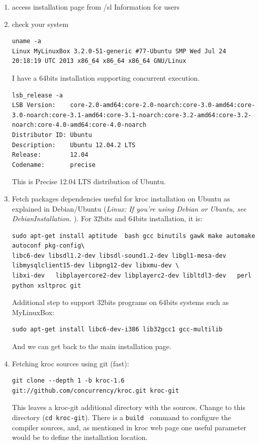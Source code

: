 \documentclass[times]{book}
\begin{document}
\begin{enumerate}
\item access installation page from {/sl Information for users}
\item check your system\\
\begin{lstlisting}
uname -a
Linux MyLinuxBox 3.2.0-51-generic #77-Ubuntu SMP Wed Jul 24 20:18:19 UTC 2013 x86_64 x86_64 x86_64 GNU/Linux
\end{lstlisting}

I have a 64bits installation supporting concurrent execution.
\begin{lstlisting} 
lsb_release -a
LSB Version:    core-2.0-amd64:core-2.0-noarch:core-3.0-amd64:core-3.0-noarch:core-3.1-amd64:core-3.1-noarch:core-3.2-amd64:core-3.2-noarch:core-4.0-amd64:core-4.0-noarch
Distributor ID: Ubuntu
Description:    Ubuntu 12.04.2 LTS
Release:        12.04
Codename:       precise
\end{lstlisting}

This is Precise 12.04 LTS distribution of Ubuntu.
\item Fetch packages dependencies useful for kroc installation on Ubuntu as explained in Debian/Ubuntu
({\sl Linux:   If you're using Debian or Ubuntu, see DebianInstallation. }). For 32bits and 64bits installation, it is:
\begin{lstlisting} 
sudo apt-get install aptitude  bash gcc binutils gawk make automake autoconf pkg-config\
libc6-dev libsdl1.2-dev libsdl-sound1.2-dev libgl1-mesa-dev   libmysqlclient15-dev libpng12-dev libxmu-dev \
libxi-dev   libplayercore2-dev libplayerc2-dev libltdl3-dev   perl python xsltproc git
\end{lstlisting} 

Additional step to support 32bits programs on 64bits systems such as MyLinuxBox:
\begin{lstlisting} 
sudo apt-get install libc6-dev-i386 lib32gcc1 gcc-multilib
\end{lstlisting} 

And we can get back to the main installation page.

\item Fetching kroc sources using git (fast):

\begin{lstlisting}  
git clone --depth 1 -b kroc-1.6 git://github.com/concurrency/kroc.git kroc-git
\end{lstlisting}  

This leaves a kroc-git additional directory with the sources. Change to this directory ({\tt cd kroc-git}).
There is a {\tt build } command to configure the compiler sources, and, as mentioned in kroc web page
one useful parameter would be to define the installation location.


\end{enumerate}
\end{document}

